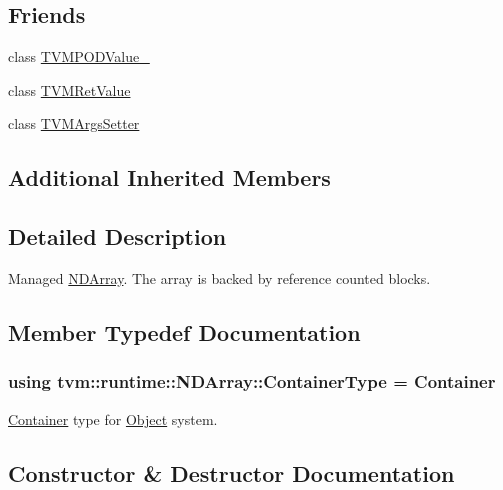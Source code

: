 \subsection*{Friends}
\begin{DoxyCompactItemize}
\item 
class \hyperlink{classtvm_1_1runtime_1_1NDArray_a9a9fd94393cfd7d4b6e6029348e3e19a}{T\+V\+M\+P\+O\+D\+Value\+\_\+}
\item 
class \hyperlink{classtvm_1_1runtime_1_1NDArray_ae0ea8b4adc6dab8c74086bceaef6b3e1}{T\+V\+M\+Ret\+Value}
\item 
class \hyperlink{classtvm_1_1runtime_1_1NDArray_a35ae555d4becf356b16aeacd353d41ee}{T\+V\+M\+Args\+Setter}
\end{DoxyCompactItemize}
\subsection*{Additional Inherited Members}


\subsection{Detailed Description}
Managed \hyperlink{classtvm_1_1runtime_1_1NDArray}{N\+D\+Array}. The array is backed by reference counted blocks. 

\subsection{Member Typedef Documentation}
\subsubsection[{\texorpdfstring{Container\+Type}{ContainerType}}]{\setlength{\rightskip}{0pt plus 5cm}using {\bf tvm\+::runtime\+::\+N\+D\+Array\+::\+Container\+Type} =  {\bf Container}}\hypertarget{classtvm_1_1runtime_1_1NDArray_abcb2ab5512d146d173e0aab86eee72a9}{}\label{classtvm_1_1runtime_1_1NDArray_abcb2ab5512d146d173e0aab86eee72a9}


\hyperlink{classtvm_1_1runtime_1_1NDArray_1_1Container}{Container} type for \hyperlink{classtvm_1_1runtime_1_1Object}{Object} system. 



\subsection{Constructor \& Destructor Documentation}
